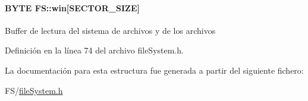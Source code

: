 \hypertarget{structFS_a23d4e26f31e8932d8b216955e6af2130}{
\paragraph[{win}]{\setlength{\rightskip}{0pt plus 5cm}B\+Y\+T\+E F\+S\+::win\mbox{[}S\+E\+C\+T\+O\+R\+\_\+\+S\+I\+Z\+E\mbox{]}}}\label{structFS_a23d4e26f31e8932d8b216955e6af2130}
Buffer de lectura del sistema de archivos y de los archivos 

Definición en la línea 74 del archivo file\+System.\+h.



La documentación para esta estructura fue generada a partir del siguiente fichero\+:\begin{DoxyCompactItemize}
\item 
F\+S/\hyperlink{fileSystem_8h}{file\+System.\+h}\end{DoxyCompactItemize}
